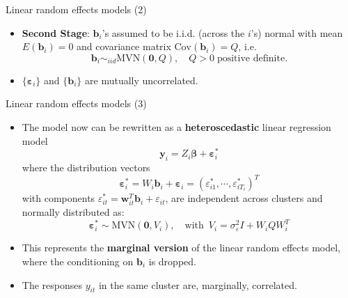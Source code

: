 \documentclass{beamer}
\newcommand{\boldbeta}{{\boldsymbol \beta}}
\newcommand{\boldvarepsilon}{{\boldsymbol \varepsilon}}
\newenvironment{wideitemize}%
  {\begin{itemize}%
    \setlength{\parskip}{1em}}%
  {\end{itemize}}
\begin{document}
\begin{frame}{Linear random effects models (2)}
\begin{wideitemize}
\item
\textbf{Second Stage}: $\mathbf{b}_i$'s assumed to be i.i.d. (across the $i$'s)
normal with mean $E(\mathbf{b}_i)=0$ and covariance matrix
$\mbox{Cov}(\mathbf{b}_i)=Q$, i.e.
\begin{equation}
\mathbf{b}_i\sim_{iid} \text{MVN}(\mathbf{0}, Q), \quad Q>0\; \mbox{positive definite.}
\label{eq-7.1.2}
\end{equation} 
\item 
 $\{\boldvarepsilon_i\}$ and $\{\mathbf{b}_i\}$ are mutually uncorrelated.

\end{wideitemize}
\end{frame}



\begin{frame}{Linear random effects models (3)}
\begin{wideitemize}
\item

The model now 
can be rewritten as a
 {\bf heteroscedastic} linear regression model
\begin{equation}
\mathbf{y}_i=Z_i\boldbeta+\boldvarepsilon_i^*
\label{eq-7.1.4}
\end{equation}
where the distribution vectors 
\[
\boldvarepsilon_i^*= W_i\mathbf{b}_i+\boldvarepsilon_i =(\varepsilon_{i1}^*, \cdots,
\varepsilon_{iT_i}^*)^T
\]
 with components $\varepsilon_{it}^*=\mathbf{w}_{it}^T\mathbf{b}_i+\varepsilon_{it}$,
are independent across clusters
and normally distributed as:
\begin{equation}
\boldvarepsilon_i^*\sim \text{MVN}(\mathbf{0}, V_i), \quad \text{with}\;\
V_i=\sigma^2_\varepsilon I+W_iQW_i^T
\label{eq-7.1.5}
\end{equation}
\item

This represents the 
\textbf{marginal version} of the linear random effects model, where the conditioning on $\mathbf{b}_i$ is
dropped.
\item
The responses $y_{it}$ in the same cluster are, marginally, correlated.

\end{wideitemize}
\end{frame}
\end{document}
